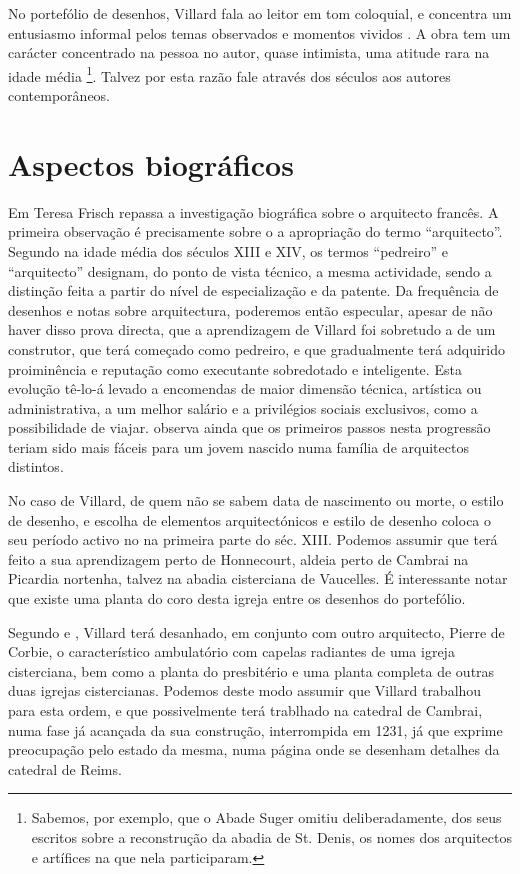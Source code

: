 \documentclass{article}
\begin{document}
No portefólio de desenhos, Villard fala ao leitor em tom coloquial, e
concentra um entusiasmo informal pelos temas observados e momentos
vividos . A obra tem um carácter concentrado na pessoa no autor, quase
intimista, uma atitude rara na idade média \footnote{Sabemos, por
  exemplo, que o Abade Suger omitiu deliberadamente, dos seus escritos
  sobre a reconstrução da abadia de St. Denis, os nomes dos
  arquitectos e artífices na que nela participaram.}. Talvez por esta
razão fale através dos séculos aos autores contemporâneos.

\section{Aspectos biográficos}

Em \cite{teresa} Teresa Frisch repassa a investigação biográfica sobre
o arquitecto francês. A primeira observação é precisamente sobre o a
apropriação do termo ``arquitecto''. Segundo \cite{pevsner} na idade
média dos séculos XIII e XIV, os termos ``pedreiro'' e ``arquitecto''
designam, do ponto de vista técnico, a mesma actividade, sendo a
distinção feita a partir do nível de especialização e da patente. Da
frequência de desenhos e notas sobre arquitectura, poderemos então
especular, apesar de não haver disso prova directa, que a aprendizagem
de Villard foi sobretudo a de um construtor, que terá começado como
pedreiro, e que gradualmente terá adquirido proiminência e reputação
como executante sobredotado e inteligente. Esta evolução tê-lo-á
levado a encomendas de maior dimensão técnica, artística ou
administrativa, a um melhor salário e a privilégios sociais
exclusivos, como a possibilidade de viajar. \cite{teresa} observa
ainda que os primeiros passos nesta progressão teriam sido mais fáceis
para um jovem nascido numa família de arquitectos distintos.

No caso de Villard, de quem não se sabem data de nascimento ou morte,
o estilo de desenho, e escolha de elementos arquitectónicos e estilo
de desenho coloca o seu período activo no na primeira parte do
séc. XIII. Podemos assumir que terá feito a sua aprendizagem perto de
Honnecourt, aldeia perto de Cambrai na Picardia nortenha, talvez na
abadia cisterciana de Vaucelles. É interessante notar que existe uma
planta do coro desta igreja entre os desenhos do portefólio.

Segundo \cite{teresa} e \cite{hanhloser}, Villard terá desanhado, em
conjunto com outro arquitecto, Pierre de Corbie, o característico
ambulatório com capelas radiantes de uma igreja cisterciana, bem como
a planta do presbitério e uma planta completa de outras duas igrejas
cistercianas. Podemos deste modo assumir que Villard trabalhou para
esta ordem, e que possivelmente terá trablhado na catedral de Cambrai,
numa fase já acançada da sua construção, interrompida em 1231, já que
exprime preocupação pelo estado da mesma, numa página onde se desenham
detalhes da catedral de Reims.
\end{document}

